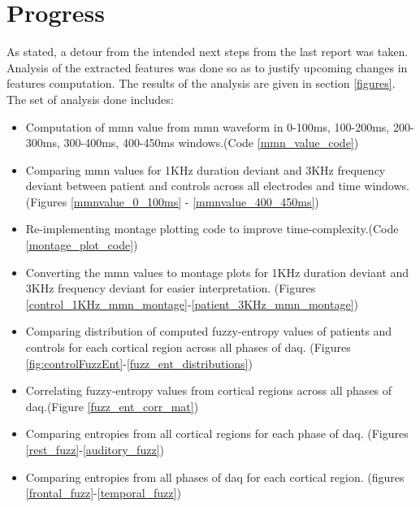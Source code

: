 \documentclass[10pt]{article}
\begin{document}
\section{Progress}
As stated, a detour from the intended next steps from the last report was taken. 
Analysis of the extracted features was done so as to justify upcoming changes in 
features computation. The results of the analysis are given in 
section \ref{figures}. The set of analysis done includes:
\begin{itemize}
  \item Computation of \gls{mmn} value from \gls{mmn} waveform in 0-100ms, 100-200ms, 
  200-300ms, 300-400ms, 400-450ms windows.(Code \ref{mmn_value_code})
  \item Comparing \gls{mmn} values for 1KHz duration deviant and 3KHz frequency deviant 
  between patient and controls across all electrodes and time windows.
  (Figures \ref{mmnvalue_0_100ms} - \ref{mmnvalue_400_450ms})
  \item Re-implementing montage plotting code to improve time-complexity.(Code \ref{montage_plot_code})
  \item Converting the \gls{mmn} values to montage plots for 1KHz duration deviant 
  and 3KHz frequency deviant for easier interpretation.
  (Figures \ref{control_1KHz_mmn_montage}-\ref{patient_3KHz_mmn_montage})
  \item Comparing distribution of computed fuzzy-entropy values of patients and controls 
  for each cortical region across all phases of \gls{daq}.
  (Figures \ref{fig:controlFuzzEnt}-\ref{fuzz_ent_distributions}) 
  \item Correlating fuzzy-entropy values from cortical regions across 
  all phases of \gls{daq}.(Figure \ref{fuzz_ent_corr_mat})
  \item Comparing entropies from all cortical regions for each phase of \gls{daq}.
  (Figures \ref{rest_fuzz}-\ref{auditory_fuzz})
  \item Comparing entropies from all phases of \gls{daq} for each cortical region.
  (figures \ref{frontal_fuzz}-\ref{temporal_fuzz})
\end{itemize} 
\end{document}
